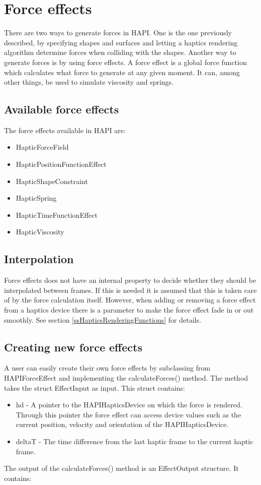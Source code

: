 \chapter{Force effects}
There are two ways to generate forces in HAPI. One is the one
previously described, by specifying shapes and surfaces and letting
a haptics rendering algorithm determine forces when colliding with the
shapes. Another way to generate forces is by using force effects. A
force effect is a global force function which calculates what force to
generate at any given moment. It can, among other things, be used to simulate
viscosity and springs. 

\section{Available force effects}
The force effects available in HAPI are:

\begin{itemize}
\item HapticForceField
\item HapticPositionFunctionEffect
\item HapticShapeConstraint
\item HapticSpring
\item HapticTimeFunctionEffect 
\item HapticViscosity
\end{itemize}

\section{Interpolation}
Force effects does not have an internal property to decide whether they
should be interpolated between frames. If this is needed it is assumed
that this is taken care of by the force calculation itself. However,
when adding or removing a force effect from a haptics device there
is a parameter to make the force effect fade in or out smoothly. See section
\ref{ssHapticsRenderingFunctions} for details.

\section{Creating new force effects}
A user can easily create their own force effects by subclassing from
HAPIForceEffect and implementing the calculateForces() method. The
method takes the struct EffectInput as input. This struct contains:

\begin{itemize}
\item hd - A pointer to the HAPIHapticsDevice on which the force is rendered.
Through this pointer the force effect can access device values such as
the current position, velocity and orientation of the HAPIHapticsDevice.
\item deltaT - The time difference from the last haptic frame to the current
haptic frame.
\end{itemize}
The output of the calculateForces() method is an EffectOutput structure.
It contains:

